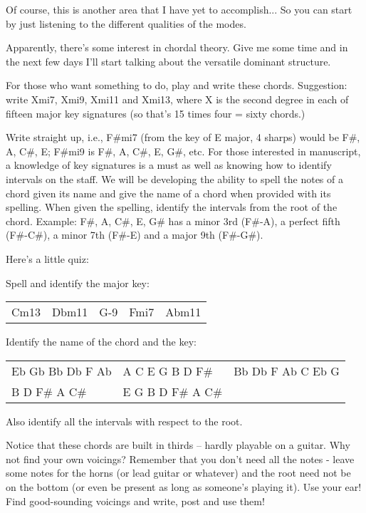 Of course, this is another area that I have yet to accomplish... So
you can start by just listening to the different qualities of the
modes.

Apparently, there's some interest in chordal theory. Give me some time and
in the next few days I'll start talking about the versatile dominant structure.

For those who want something to do, play and write these chords. Suggestion:
write Xmi7, Xmi9, Xmi11 and Xmi13, where X is the second degree in each of
fifteen major key signatures (so that's 15 times four = sixty chords.)

Write straight up, i.e., F\#mi7 (from the key of E major, 4 sharps) would be
F\#, A, C\#, E; F\#mi9 is F\#, A, C\#, E, G\#, etc. For those interested in
manuscript, a knowledge of key signatures is a must as well as knowing how
to identify intervals on the staff. We will be developing the ability to
spell the notes of a chord given its name and give the name of a chord when
provided with its spelling. When given the spelling, identify the intervals
from the root of the chord. Example: F\#, A, C\#, E, G\# has a minor 3rd (F\#-A),
a perfect fifth (F\#-C\#), a minor 7th (F\#-E) and a major 9th (F\#-G\#).

Here's a little quiz:

Spell and identify the major key:

\begin{center}
\begin{tabular}{ c c c c c }
  Cm13 & Dbm11 & G-9 & Fmi7 & Abm11\\
\end{tabular}
\end{center}

Identify the name of the chord and the key:

\begin{center}
\begin{tabular}{ l l l }
Eb Gb Bb Db F Ab  & A C E G B D F\#   & Bb Db F Ab C Eb G\\
B D F\# A C\#     & E G B D F\# A C\# &
\end{tabular}
\end{center}

Also identify all the intervals with respect to the root.

Notice that these chords are built in thirds -- hardly playable on a guitar.
Why not find your own voicings? Remember that you don't need all the notes -
leave some notes for the horns (or lead guitar or whatever) and the root
need not be on the bottom (or even be present as long as someone's playing
it). Use your ear! Find good-sounding voicings and write, post and use them!
